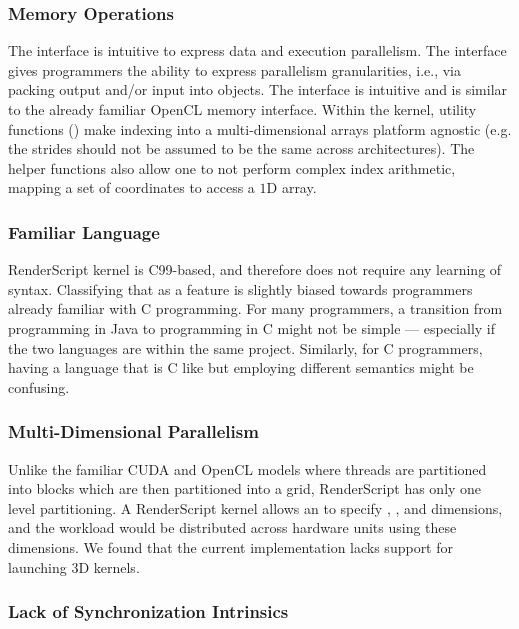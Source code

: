 \subsubsection{Memory Operations}

The  interface is intuitive to express data and
execution parallelism. The
 interface gives programmers the ability to express parallelism
granularities, i.e., via packing output and/or input into  objects.
The interface is intuitive and is similar to the already familiar OpenCL memory interface.
Within the kernel, utility functions () make indexing
into a multi-dimensional arrays platform agnostic (e.g. the strides should not
be assumed to be the same across architectures).  The helper functions also
allow one to not perform complex index arithmetic, mapping a set of coordinates
to access a $1$D array.


\subsubsection{Familiar Language}

RenderScript kernel is C99-based, and therefore does not require any learning of
syntax.  Classifying that as a feature is slightly biased towards programmers
already familiar with C programming.  For many programmers, a transition from
programming in Java to programming in C might not be simple --- especially if
the two languages are within the same project.  Similarly, for C programmers,
having a language that is C like but employing different semantics might be
confusing.


\subsubsection{Multi-Dimensional Parallelism}

Unlike the familiar CUDA and OpenCL models where threads are partitioned into
blocks which are then partitioned into a grid, RenderScript has only one level
partitioning.  A RenderScript kernel allows an  to specify
, , and  dimensions, and the workload would be distributed
across hardware units using these dimensions.  We found that the current
implementation lacks support for launching $3$D kernels.

\subsubsection{Lack of Synchronization Intrinsics}


